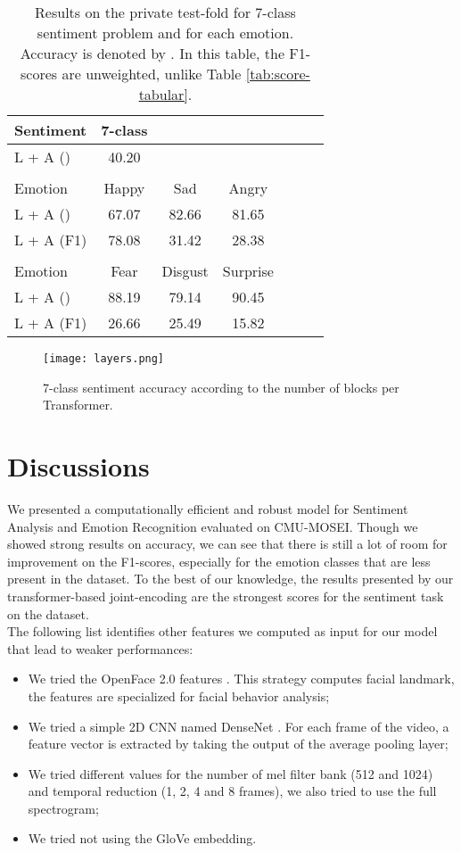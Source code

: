 \documentclass[11pt,a4paper]{article}
\begin{document}
\begin{table}[ht]
	\centering
	\begin{tabular}{lcccccc}
	Sentiment  & 7-class \\
    \hline
    L + A () & 40.20 \\
    &\\
    Emotion & Happy & Sad & Angry \\
        \hline
    L + A () & 67.07 & 82.66 & 81.65 \\
    L + A (F1) & 78.08 & 31.42 & 28.38 \\
        &\\
    Emotion & Fear & Disgust & Surprise \\
        \hline
    L + A () &  88.19 & 79.14 & 90.45 \\
    L + A (F1) &  26.66 & 25.49 & 15.82 \\
	\end{tabular}
\caption{Results on the private test-fold for 7-class sentiment problem and for each emotion. Accuracy is denoted by . In this table, the F1-scores are unweighted, unlike Table \ref{tab:score-tabular}.}
\label{table:private_fold}
\end{table}


\begin{figure}[!ht] 
\centering
\texttt{[image: layers.png]}
\caption{7-class sentiment accuracy according to the number of blocks per Transformer.}
\label{fig:blocks}
\end{figure}

\section{Discussions}
We presented a computationally efficient and robust model for Sentiment Analysis and Emotion Recognition evaluated on CMU-MOSEI. Though we showed strong results on accuracy, we can see that there is still a lot of room for improvement on the F1-scores, especially for the emotion classes that are less present in the dataset. To the best of our knowledge, the results presented by our transformer-based joint-encoding are the strongest scores for the sentiment task on the dataset. \\

The following list identifies other features we computed as input for our model that lead to weaker performances:
\begin{itemize}
    \item We tried the OpenFace 2.0 features \cite{baltrusaitis2018openface}. This strategy computes facial landmark, the features are specialized for facial behavior analysis;
    \item We tried a simple 2D CNN named DenseNet \cite{huang2017densely}. For each frame of the video, a feature vector is extracted by taking the output of the average pooling layer;
    \item We tried different values for the number of mel filter bank (512 and 1024) and temporal reduction (1, 2, 4 and 8 frames), we also tried to use the full spectrogram;
    \item We tried not using the GloVe embedding.
\end{itemize}
\end{document}
